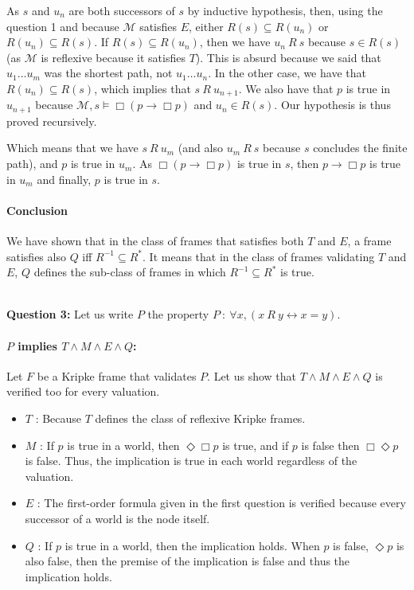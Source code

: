 \documentclass[10pt]{article}
\def\question#1{\ \vspace{1cm}\\\textbf{Question #1:}\quad}
\def\M{\mathcal{M}}
\begin{document}
As $s$ and $u_n$ are both successors of $s$ by inductive hypothesis, then, using the question 1 and because $\M$ satisfies $E$, either $R(s)\subseteq R(u_n)$ or $R(u_n)\subseteq R(s)$. If $R(s)\subseteq R(u_n)$, then we have $u_n\ R\ s$ because $s\in R(s)$ (as $\M$ is reflexive because it satisfies $T$). This is absurd because we said that $u_1\dots u_m$ was the shortest path, not $u_1\dots u_n$. In the other case, we have that $R(u_n)\subseteq R(s)$, which implies that $s\ R\ u_{n+1}$. We also have that $p$ is true in $u_{n+1}$ because $\M,s\models\Box(p\rightarrow\Box p)$ and $u_n\in R(s)$. Our hypothesis is thus proved recursively.

Which means that we have $s\ R\ u_m$ (and also $u_m\ R\ s$ because $s$ concludes the finite path), and $p$ is true in $u_m$. As $\Box(p\rightarrow\Box p)$ is true in $s$, then $p\rightarrow\Box p$ is true in $u_m$ and finally, $p$ is true in $s$.

\paragraph{Conclusion}
We have shown that in the class of frames that satisfies both $T$ and $E$, a frame satisfies also $Q$ iff $R^{-1}\subseteq R^*$. It means that in the class of frames validating $T$ and $E$, $Q$ defines the sub-class of frames in which $R^{-1}\subseteq R^*$ is true.

\question{3}
Let us write $P$ the property $P\ :\ \forall x,(x\ R\ y\leftrightarrow x=y)$.

\paragraph{$P$ implies $T\wedge M\wedge E\wedge Q$:}
Let $F$ be a Kripke frame that validates $P$. Let us show that $T\wedge M\wedge E\wedge Q$ is verified too for every valuation.
\begin{itemize}
\item $T$ : Because $T$ defines the class of reflexive Kripke frames.
\item $M$ : If $p$ is true in a world, then $\Diamond\Box p$ is true, and if $p$ is false then $\Box\Diamond p$ is false. Thus, the implication is true in each world regardless of the valuation.
\item $E$ : The first-order formula given in the first question is verified because every successor of a world is the node itself.
\item $Q$ : If $p$ is true in a world, then the implication holds. When $p$ is false, $\Diamond p$ is also false, then the premise of the implication is false and thus the implication holds.
\end{itemize}
\end{document}
